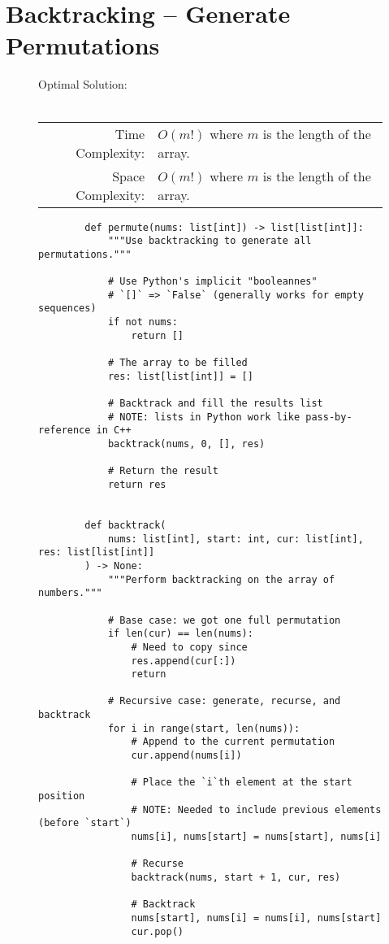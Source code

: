 
\section{Backtracking -- Generate Permutations}

\begin{figure}[H]
    Optimal Solution:\\\\
    \begin{tabular}{rl}
        Time Complexity:& \(O(m!)\) where \(m\) is the length of the array.\\
        Space Complexity:& \(O(m!)\) where \(m\) is the length of the array.
    \end{tabular}
\end{figure}

\begin{figure}[H]
    \centering
    \begin{verbatim}
        def permute(nums: list[int]) -> list[list[int]]:
            """Use backtracking to generate all permutations."""

            # Use Python's implicit "booleannes"
            # `[]` => `False` (generally works for empty sequences)
            if not nums:
                return []

            # The array to be filled
            res: list[list[int]] = []

            # Backtrack and fill the results list
            # NOTE: lists in Python work like pass-by-reference in C++
            backtrack(nums, 0, [], res)

            # Return the result
            return res


        def backtrack(
            nums: list[int], start: int, cur: list[int], res: list[list[int]]
        ) -> None:
            """Perform backtracking on the array of numbers."""

            # Base case: we got one full permutation
            if len(cur) == len(nums):
                # Need to copy since
                res.append(cur[:])
                return

            # Recursive case: generate, recurse, and backtrack
            for i in range(start, len(nums)):
                # Append to the current permutation
                cur.append(nums[i])

                # Place the `i`th element at the start position
                # NOTE: Needed to include previous elements (before `start`)
                nums[i], nums[start] = nums[start], nums[i]

                # Recurse
                backtrack(nums, start + 1, cur, res)

                # Backtrack
                nums[start], nums[i] = nums[i], nums[start]
                cur.pop()
    \end{verbatim}
\end{figure}
